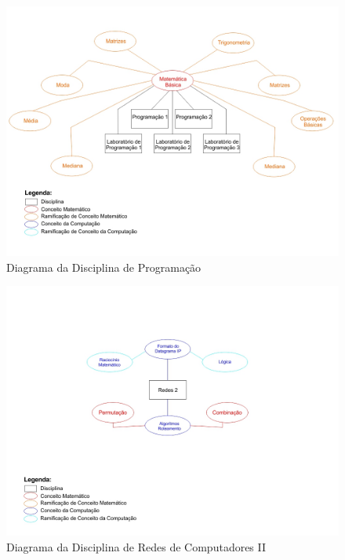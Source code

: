 \documentclass[12pt,a4paper]{article}
\begin{document}
\begin{figure}[!h]
	\centering
	\includegraphics[scale=0.4]{imagens/Diagrama Programacao.jpg} 
	\caption{Diagrama da Disciplina de Programação}
\end{figure}

\begin{figure}[!h]
	\centering
	\includegraphics[scale=0.5]{imagens/Diagrama Redes 2.jpg} 
	\caption{Diagrama da Disciplina de Redes de Computadores II}
\end{figure}
\end{document}
